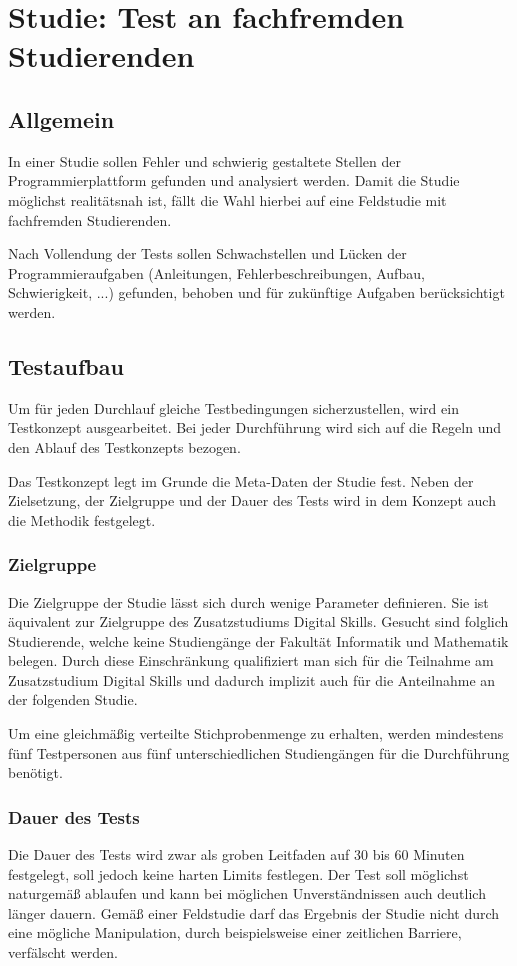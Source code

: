 \section{Studie: Test an fachfremden Studierenden}\label{studie}
\subsection{Allgemein}
In einer Studie sollen Fehler und schwierig gestaltete Stellen der
Programmierplattform gefunden und analysiert werden. Damit die Studie möglichst
realitätsnah ist, fällt die Wahl hierbei auf eine Feldstudie mit fachfremden
Studierenden.

Nach Vollendung der Tests sollen Schwachstellen und Lücken der
Programmieraufgaben (Anleitungen, Fehlerbeschreibungen, Aufbau,
Schwierigkeit, ...) gefunden, behoben und für zukünftige Aufgaben berücksichtigt
werden. \parencite{studie-testkonzept}

\subsection{Testaufbau}
Um für jeden Durchlauf gleiche Testbedingungen sicherzustellen, wird ein
Testkonzept ausgearbeitet. Bei jeder Durchführung wird sich auf die Regeln
und den Ablauf des Testkonzepts bezogen.

Das Testkonzept legt im Grunde die Meta-Daten der Studie fest. Neben der
Zielsetzung, der Zielgruppe und der Dauer des Tests wird in dem Konzept auch die
Methodik festgelegt.

\subsubsection{Zielgruppe}
Die Zielgruppe der Studie lässt sich durch wenige Parameter definieren. Sie
ist äquivalent zur Zielgruppe des Zusatzstudiums Digital Skills. Gesucht sind
folglich Studierende, welche keine Studiengänge der Fakultät Informatik und
Mathematik belegen. Durch diese Einschränkung qualifiziert man sich für die
Teilnahme am Zusatzstudium Digital Skills und dadurch implizit auch für die
Anteilnahme an der folgenden Studie.

Um eine gleichmäßig verteilte Stichprobenmenge zu erhalten, werden mindestens
fünf Testpersonen aus fünf unterschiedlichen Studiengängen für die Durchführung
benötigt.

\subsubsection{Dauer des Tests}
Die Dauer des Tests wird zwar als groben Leitfaden auf 30 bis 60 Minuten
festgelegt, soll jedoch keine harten Limits festlegen. Der Test soll möglichst
naturgemäß ablaufen und kann bei möglichen Unverständnissen auch deutlich länger
dauern. Gemäß einer Feldstudie darf das Ergebnis der Studie nicht durch eine
mögliche Manipulation, durch beispielsweise einer zeitlichen Barriere,
verfälscht werden.

